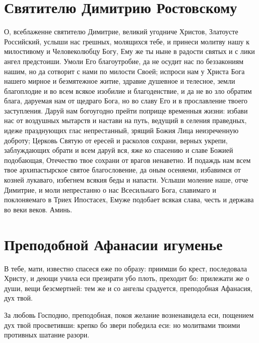 \section{Святителю Димитрию Ростовскому}\begin{mymulticols}




О, всеблаженне святителю Димитрие, великий угодниче Христов, Златоусте Российский, услыши нас грешных, молящихся тебе, и принеси молитву нашу к милостивому и Человеколюбцу Богу, Ему же ты ныне в радости святых и с лики ангел предстоиши. Умоли Его благоутробие, да не осудит нас по беззакониям нашим, но да сотворит с нами по милости Своей; испроси нам у Христа Бога нашего мирное и безмятежное житие, здравие душевное и телесное, земли благоплодие и во всем всякое изобилие и благоденствие, и да не во зло обратим блага, даруемая нам от щедраго Бога, но во славу Его и в прославление твоего заступления. Даруй нам богоугодно прейти поприще временныя жизни: избави нас от воздушных мытарств и настави на путь, ведущий в селения праведных, идеже празднующих глас непрестанный, зрящий Божия Лица неизреченную доброту; Церковь Святую от ересей и расколов сохрани, верных укрепи, заблуждающих обрати и всем даруй вся, яже ко спасению и славе Божией подобающая, Отечество твое сохрани от врагов ненаветно. И подаждь нам всем твое архипастырское святое благословение, да оным осеняеми, избавимся от козней лукаваго, избегнем всякия беды и напасти. Услыши моление наше, отче Димитрие, и моли непрестанно о нас Всесильнаго Бога, славимаго и поклоняемаго в Триех Ипостасех, Емуже подобает всякая слава, честь и держава во веки веков. Аминь.

\end{mymulticols}

\mychapterending





\section{Преподобной Афанасии игуменье}\begin{mymulticols}




 В тебе, мати, известно спасеся еже по образу: приимши бо крест, последовала Христу, и деющи учила еси презирати убо плоть, преходит бо: прилежати же о души, вещи безсмертней: тем же и со ангелы срадуется, преподобная Афанасия, дух твой.



 За любовь Господню, преподобная, покоя желание возненавидела еси, пощением дух твой просветивши: крепко бо звери победила еси: но молитвами твоими противных шатание разори.

\end{mymulticols}


